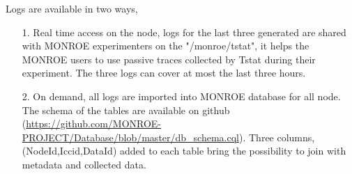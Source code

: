 \documentclass[a4paper,10pt]{article}
\begin{document}
Logs are available in two ways, 
\begin{itemize}
\item[1.] Real time access on the node, logs for the last three generated are shared with MONROE experimenters on the "/monroe/tstat", it helps the MONROE users to use passive traces collected by Tstat during their experiment. The three logs can cover at most the last three hours.
\item[2.] On demand, all logs are imported into MONROE database for all node. The schema of the tables are available on github (\url{https://github.com/MONROE-PROJECT/Database/blob/master/db_schema.cql}). Three columns, (NodeId,Iccid,DataId) added to each table bring the possibility to join with metadata and collected data. 
\end{itemize}
\end{document}
